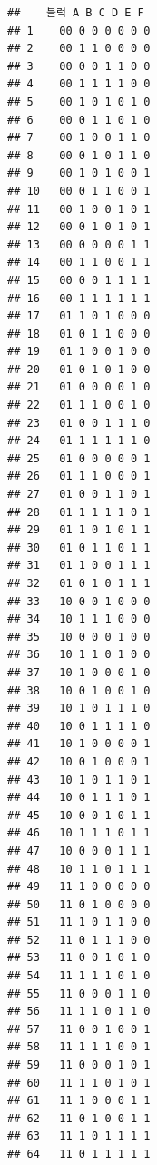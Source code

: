 \documentclass[
]{book}
\begin{document}
\begin{verbatim}
##    블럭 A B C D E F
## 1    00 0 0 0 0 0 0
## 2    00 1 1 0 0 0 0
## 3    00 0 0 1 1 0 0
## 4    00 1 1 1 1 0 0
## 5    00 1 0 1 0 1 0
## 6    00 0 1 1 0 1 0
## 7    00 1 0 0 1 1 0
## 8    00 0 1 0 1 1 0
## 9    00 1 0 1 0 0 1
## 10   00 0 1 1 0 0 1
## 11   00 1 0 0 1 0 1
## 12   00 0 1 0 1 0 1
## 13   00 0 0 0 0 1 1
## 14   00 1 1 0 0 1 1
## 15   00 0 0 1 1 1 1
## 16   00 1 1 1 1 1 1
## 17   01 1 0 1 0 0 0
## 18   01 0 1 1 0 0 0
## 19   01 1 0 0 1 0 0
## 20   01 0 1 0 1 0 0
## 21   01 0 0 0 0 1 0
## 22   01 1 1 0 0 1 0
## 23   01 0 0 1 1 1 0
## 24   01 1 1 1 1 1 0
## 25   01 0 0 0 0 0 1
## 26   01 1 1 0 0 0 1
## 27   01 0 0 1 1 0 1
## 28   01 1 1 1 1 0 1
## 29   01 1 0 1 0 1 1
## 30   01 0 1 1 0 1 1
## 31   01 1 0 0 1 1 1
## 32   01 0 1 0 1 1 1
## 33   10 0 0 1 0 0 0
## 34   10 1 1 1 0 0 0
## 35   10 0 0 0 1 0 0
## 36   10 1 1 0 1 0 0
## 37   10 1 0 0 0 1 0
## 38   10 0 1 0 0 1 0
## 39   10 1 0 1 1 1 0
## 40   10 0 1 1 1 1 0
## 41   10 1 0 0 0 0 1
## 42   10 0 1 0 0 0 1
## 43   10 1 0 1 1 0 1
## 44   10 0 1 1 1 0 1
## 45   10 0 0 1 0 1 1
## 46   10 1 1 1 0 1 1
## 47   10 0 0 0 1 1 1
## 48   10 1 1 0 1 1 1
## 49   11 1 0 0 0 0 0
## 50   11 0 1 0 0 0 0
## 51   11 1 0 1 1 0 0
## 52   11 0 1 1 1 0 0
## 53   11 0 0 1 0 1 0
## 54   11 1 1 1 0 1 0
## 55   11 0 0 0 1 1 0
## 56   11 1 1 0 1 1 0
## 57   11 0 0 1 0 0 1
## 58   11 1 1 1 0 0 1
## 59   11 0 0 0 1 0 1
## 60   11 1 1 0 1 0 1
## 61   11 1 0 0 0 1 1
## 62   11 0 1 0 0 1 1
## 63   11 1 0 1 1 1 1
## 64   11 0 1 1 1 1 1
\end{verbatim}

  
\end{document}
